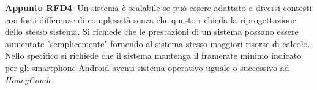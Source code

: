     \textbf{Appunto RFD4}: Un sistema è scalabile se può essere adattato a diversi contesti con forti differenze di complessità senza che questo richieda la riprogettazione dello stesso sistema. Si richiede che le prestazioni di un sistema possano essere aumentate "semplicemente" fornendo al sistema stesso maggiori risorse di calcolo. Nello specifico si richiede che il sistema mantenga il framerate minimo indicato per gli smartphone Android aventi sistema operativo uguale o successivo ad \textit{HoneyComb}.


